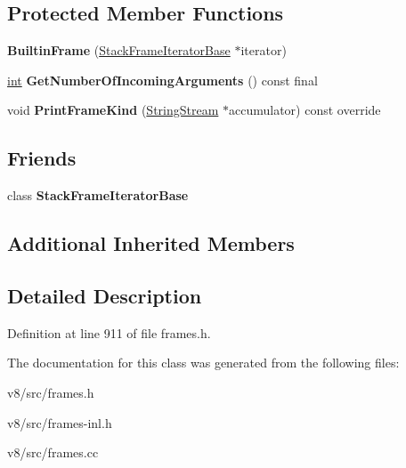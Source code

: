\subsection*{Protected Member Functions}
\begin{DoxyCompactItemize}
\item 
\mbox{\label{classv8_1_1internal_1_1BuiltinFrame_a3d5d011d43c5da42592d50dcc0482cc9}} 
{\bfseries Builtin\+Frame} (\mbox{\hyperlink{classv8_1_1internal_1_1StackFrameIteratorBase}{Stack\+Frame\+Iterator\+Base}} $\ast$iterator)
\item 
\mbox{\label{classv8_1_1internal_1_1BuiltinFrame_a0b0235384e7a68c328faf469fa947b0f}} 
\mbox{\hyperlink{classint}{int}} {\bfseries Get\+Number\+Of\+Incoming\+Arguments} () const final
\item 
\mbox{\label{classv8_1_1internal_1_1BuiltinFrame_a6c9e6dfaa500aed3f76141c6c4b9264e}} 
void {\bfseries Print\+Frame\+Kind} (\mbox{\hyperlink{classv8_1_1internal_1_1StringStream}{String\+Stream}} $\ast$accumulator) const override
\end{DoxyCompactItemize}
\subsection*{Friends}
\begin{DoxyCompactItemize}
\item 
\mbox{\label{classv8_1_1internal_1_1BuiltinFrame_ac7310421866976ca454bbe11c5f926c3}} 
class {\bfseries Stack\+Frame\+Iterator\+Base}
\end{DoxyCompactItemize}
\subsection*{Additional Inherited Members}


\subsection{Detailed Description}


Definition at line 911 of file frames.\+h.



The documentation for this class was generated from the following files\+:\begin{DoxyCompactItemize}
\item 
v8/src/frames.\+h\item 
v8/src/frames-\/inl.\+h\item 
v8/src/frames.\+cc\end{DoxyCompactItemize}

